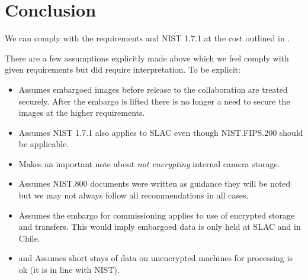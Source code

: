 \section{Conclusion}\label{sec:conc}
We can comply with the requirements and \gls{NIST} 1.7.1 at the cost outlined in .

There are a few assumptions explicitly made above which we feel comply with given requirements but did require interpretation. To be explicit:
\begin{itemize}
\item {} Assumes embargoed images before release to the collaboration are treated securely. After the embargo is lifted there is no longer a need to secure the images at the higher requirements.
\item {} Assumes NIST 1.7.1 also applies to \gls{SLAC} even though NIST.FIPS.200 should be applicable.
\item {} Makes an important note about \emph{not encrypting} internal \gls{camera} storage.
\item {} Assumes \gls{NIST}.800 documents were written as guidance  they will be noted but we may not always follow all recommendations in all cases.
\item {} Assumes the embargo for commissioning applies to use of encrypted storage and transfers.
This would imply embargoed data is only held at SLAC and in Chile.
\item {} and  Assumes short stays of data on unencrypted machines for processing is ok (it is in line with \gls{NIST}).

\end{itemize}
